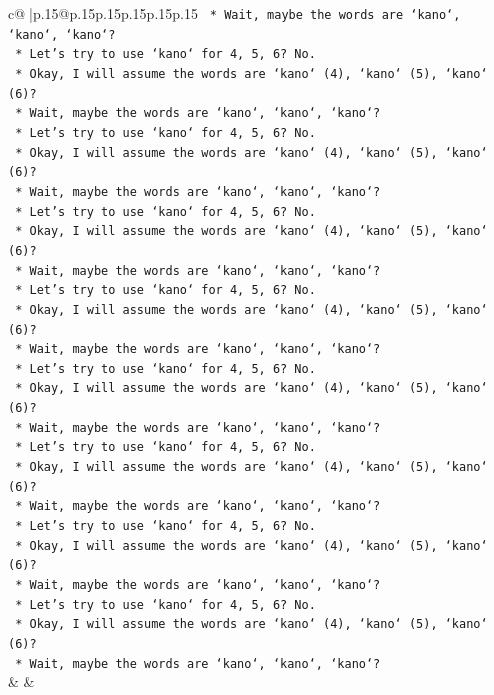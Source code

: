 \documentclass{article}
\begin{document}
{\begin{supertabular}{c@{$\;$}|p{.15\linewidth}@{}p{.15\linewidth}p{.15\linewidth}p{.15\linewidth}p{.15\linewidth}p{.15\linewidth}}
{{{\texttt{        *   Wait, maybe the words are `kano`, `kano`, `kano`?} \\
\texttt{        *   Let's try to use `kano` for 4, 5, 6? No.} \\
\texttt{        *   Okay, I will assume the words are `kano` (4), `kano` (5), `kano` (6)?} \\
\texttt{        *   Wait, maybe the words are `kano`, `kano`, `kano`?} \\
\texttt{        *   Let's try to use `kano` for 4, 5, 6? No.} \\
\texttt{        *   Okay, I will assume the words are `kano` (4), `kano` (5), `kano` (6)?} \\
\texttt{        *   Wait, maybe the words are `kano`, `kano`, `kano`?} \\
\texttt{        *   Let's try to use `kano` for 4, 5, 6? No.} \\
\texttt{        *   Okay, I will assume the words are `kano` (4), `kano` (5), `kano` (6)?} \\
\texttt{        *   Wait, maybe the words are `kano`, `kano`, `kano`?} \\
\texttt{        *   Let's try to use `kano` for 4, 5, 6? No.} \\
\texttt{        *   Okay, I will assume the words are `kano` (4), `kano` (5), `kano` (6)?} \\
\texttt{        *   Wait, maybe the words are `kano`, `kano`, `kano`?} \\
\texttt{        *   Let's try to use `kano` for 4, 5, 6? No.} \\
\texttt{        *   Okay, I will assume the words are `kano` (4), `kano` (5), `kano` (6)?} \\
\texttt{        *   Wait, maybe the words are `kano`, `kano`, `kano`?} \\
\texttt{        *   Let's try to use `kano` for 4, 5, 6? No.} \\
\texttt{        *   Okay, I will assume the words are `kano` (4), `kano` (5), `kano` (6)?} \\
\texttt{        *   Wait, maybe the words are `kano`, `kano`, `kano`?} \\
\texttt{        *   Let's try to use `kano` for 4, 5, 6? No.} \\
\texttt{        *   Okay, I will assume the words are `kano` (4), `kano` (5), `kano` (6)?} \\
\texttt{        *   Wait, maybe the words are `kano`, `kano`, `kano`?} \\
\texttt{        *   Let's try to use `kano` for 4, 5, 6? No.} \\
\texttt{        *   Okay, I will assume the words are `kano` (4), `kano` (5), `kano` (6)?} \\
\texttt{        *   Wait, maybe the words are `kano`, `kano`, `kano`?} \\
            }
        }
    }
    & & \\ \\


\end{supertabular}}
\end{document}
